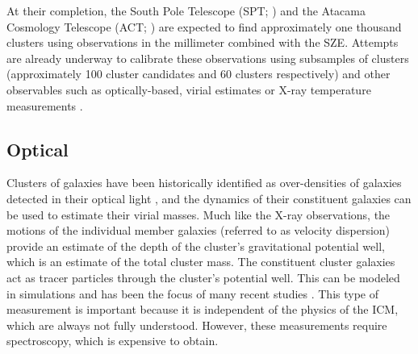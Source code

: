 At their completion, the South Pole Telescope (SPT; \citealt{Carlstrom2011}) and the Atacama Cosmology Telescope (ACT; \citealt{Swetz2011}) are expected to find approximately one thousand clusters using observations in the millimeter combined with the SZE. Attempts are already underway to calibrate these observations using subsamples of clusters (approximately 100 cluster candidates and 60 clusters respectively) and other observables such as optically-based, virial estimates or X-ray temperature measurements . 

\subsection{Optical}
Clusters of galaxies have been historically identified as over-densities of galaxies detected in their optical light , and the dynamics of their constituent galaxies can be used to estimate their virial masses. Much like the X-ray observations, the motions of the individual member galaxies (referred to as velocity dispersion) provide an estimate of the depth of the cluster's gravitational potential well, which is an estimate of the total cluster mass. The constituent cluster galaxies act as tracer particles through the cluster's potential well. This can be modeled in simulations and has been the focus of many recent studies . This type of measurement is important because it is independent of the physics of the ICM, which are always not fully understood. However, these measurements require spectroscopy, which is expensive to obtain.

